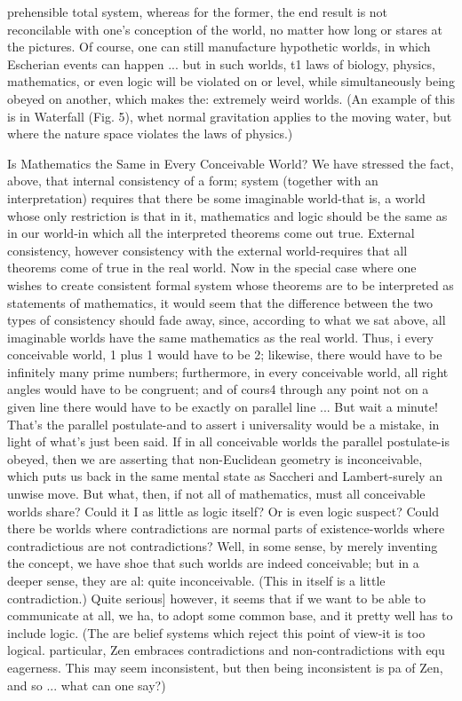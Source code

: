 prehensible total system, whereas for the former, the end result is not reconcilable with
one's conception of the world, no matter how long or stares at the pictures. Of course, one
can still manufacture hypothetic worlds, in which Escherian events can happen ... but in
such worlds, t1 laws of biology, physics, mathematics, or even logic will be violated on
or level, while simultaneously being obeyed on another, which makes the: extremely
weird worlds. (An example of this is in Waterfall (Fig. 5), whet normal gravitation
applies to the moving water, but where the nature space violates the laws of physics.)

           Is Mathematics the Same in Every Conceivable World?
We have stressed the fact, above, that internal consistency of a form; system (together
with an interpretation) requires that there be some imaginable world-that is, a world
whose only restriction is that in it, mathematics and logic should be the same as in our
world-in which all the interpreted theorems come out true. External consistency, however
consistency with the external world-requires that all theorems come of true in the real
world. Now in the special case where one wishes to create consistent formal system
whose theorems are to be interpreted as statements of mathematics, it would seem that
the difference between the two types of consistency should fade away, since, according to
what we sat above, all imaginable worlds have the same mathematics as the real world.
Thus, i every conceivable world, 1 plus 1 would have to be 2; likewise, there would have
to be infinitely many prime numbers; furthermore, in every conceivable world, all right
angles would have to be congruent; and of cours4 through any point not on a given line
there would have to be exactly on parallel line ...
        But wait a minute! That's the parallel postulate-and to assert i universality would
be a mistake, in light of what's just been said. If in all conceivable worlds the parallel
postulate-is obeyed, then we are asserting that non-Euclidean geometry is inconceivable,
which puts us back in the same mental state as Saccheri and Lambert-surely an unwise
move. But what, then, if not all of mathematics, must all conceivable worlds share?
Could it I as little as logic itself? Or is even logic suspect? Could there be worlds where
contradictions are normal parts of existence-worlds where contradictious are not
contradictions?
        Well, in some sense, by merely inventing the concept, we have shoe that such
worlds are indeed conceivable; but in a deeper sense, they are al: quite inconceivable.
(This in itself is a little contradiction.) Quite serious] however, it seems that if we want to
be able to communicate at all, we ha, to adopt some common base, and it pretty well has
to include logic. (The are belief systems which reject this point of view-it is too logical.
particular, Zen embraces contradictions and non-contradictions with equ eagerness. This
may seem inconsistent, but then being inconsistent is pa of Zen, and so ... what can one
say?)




